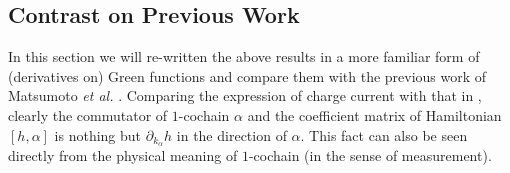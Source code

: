 \documentclass[10pt,nofootinbib]{revtex4}
\begin{document}
\iffalse
	\subsection{Contrast on Previous Work}
		In this section we will re-written the above results in a more familiar form of (derivatives on) Green functions and compare them with the previous work of Matsumoto \textit{et al.} \cite{matsumoto2014thermal}. Comparing the expression of charge current with that in \cite{streda1982theory}, clearly the commutator of $1$-cochain $\alpha$ and the coefficient matrix of Hamiltonian $[h,\alpha]$ is nothing but $\partial_{k_\alpha}h$ in the direction of $\alpha$. This fact can also be seen directly from the physical meaning of $1$-cochain (in the sense of measurement).\par
\end{document}
